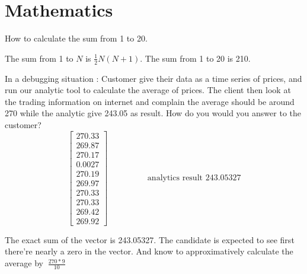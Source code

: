 \documentclass{exam}%
\begin{document}
\section{Mathematics}
\renewcommand{\questionlabel}{Math.~\thequestion ]}
\begin{questions}
\question How to calculate the sum from 1 to 20.
\begin{solution}[.2in]
	The sum from 1 to $N$ is $\frac{1}{2}N(N+1)$. The sum from 1 to 20 is 210.
\end{solution}

\question In a debugging situation : Customer give their data as a time series of prices, and run our analytic tool to calculate the average of prices. The client then look at the trading information on internet and complain the average should be around 270 while the analytic give 243.05 as result. How do you would you answer to the customer? 
\[
\left[ 
\begin{array}{c}
270.33 \\
269.87 \\
270.17 \\
0.0027 \\
270.19 \\
269.97 \\
270.33 \\
270.33 \\
269.42 \\
269.92
\end{array}
\right]
\hspace{2cm}
\text{analytics result 243.05327}
\]
\begin{solution}[.2in]
	The exact sum of the vector is 243.05327. The candidate is expected to see first there're nearly a zero in the vector. And know to approximatively calculate the average by $~ \frac{270*9}{10}$
\end{solution}


\end{questions}
\end{document}
